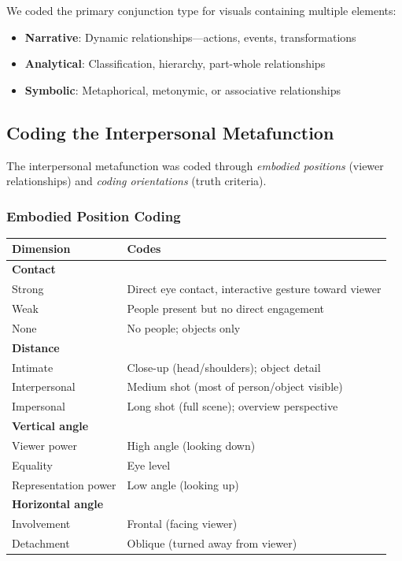 \documentclass[../main.tex]{subfiles}
\begin{document}
We coded the primary conjunction type for visuals containing multiple elements:

\begin{itemize}
    \item \textbf{Narrative}: Dynamic relationships---actions, events, transformations
    \item \textbf{Analytical}: Classification, hierarchy, part-whole relationships
    \item \textbf{Symbolic}: Metaphorical, metonymic, or associative relationships
\end{itemize}

\subsection{Coding the Interpersonal Metafunction}

The interpersonal metafunction was coded through \textit{embodied positions} (viewer relationships) and \textit{coding orientations} (truth criteria).

\subsubsection{Embodied Position Coding}

\begin{center}
\small
\begin{tabular}{lp{8cm}}
\toprule
\textbf{Dimension} & \textbf{Codes} \\
\midrule
\textbf{Contact} & \\
\quad Strong & Direct eye contact, interactive gesture toward viewer \\
\quad Weak & People present but no direct engagement \\
\quad None & No people; objects only \\
\midrule
\textbf{Distance} & \\
\quad Intimate & Close-up (head/shoulders); object detail \\
\quad Interpersonal & Medium shot (most of person/object visible) \\
\quad Impersonal & Long shot (full scene); overview perspective \\
\midrule
\textbf{Vertical angle} & \\
\quad Viewer power & High angle (looking down) \\
\quad Equality & Eye level \\
\quad Representation power & Low angle (looking up) \\
\midrule
\textbf{Horizontal angle} & \\
\quad Involvement & Frontal (facing viewer) \\
\quad Detachment & Oblique (turned away from viewer) \\
\bottomrule
\end{tabular}
\end{center}
\end{document}

